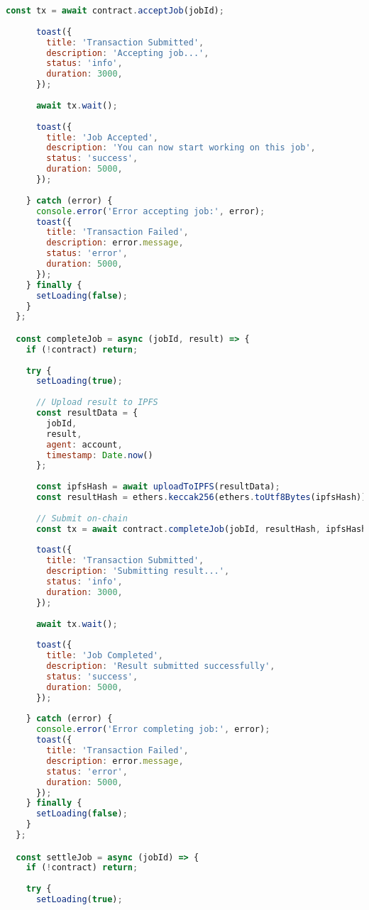 \begin{lstlisting}[language=JavaScript,caption={App.jsx - Main React Application}]
      const tx = await contract.acceptJob(jobId);
      
      toast({
        title: 'Transaction Submitted',
        description: 'Accepting job...',
        status: 'info',
        duration: 3000,
      });
      
      await tx.wait();
      
      toast({
        title: 'Job Accepted',
        description: 'You can now start working on this job',
        status: 'success',
        duration: 5000,
      });
      
    } catch (error) {
      console.error('Error accepting job:', error);
      toast({
        title: 'Transaction Failed',
        description: error.message,
        status: 'error',
        duration: 5000,
      });
    } finally {
      setLoading(false);
    }
  };

  const completeJob = async (jobId, result) => {
    if (!contract) return;
    
    try {
      setLoading(true);
      
      // Upload result to IPFS
      const resultData = {
        jobId,
        result,
        agent: account,
        timestamp: Date.now()
      };
      
      const ipfsHash = await uploadToIPFS(resultData);
      const resultHash = ethers.keccak256(ethers.toUtf8Bytes(ipfsHash));
      
      // Submit on-chain
      const tx = await contract.completeJob(jobId, resultHash, ipfsHash);
      
      toast({
        title: 'Transaction Submitted',
        description: 'Submitting result...',
        status: 'info',
        duration: 3000,
      });
      
      await tx.wait();
      
      toast({
        title: 'Job Completed',
        description: 'Result submitted successfully',
        status: 'success',
        duration: 5000,
      });
      
    } catch (error) {
      console.error('Error completing job:', error);
      toast({
        title: 'Transaction Failed',
        description: error.message,
        status: 'error',
        duration: 5000,
      });
    } finally {
      setLoading(false);
    }
  };

  const settleJob = async (jobId) => {
    if (!contract) return;
    
    try {
      setLoading(true);
      

\end{lstlisting}
